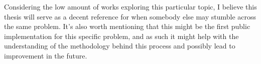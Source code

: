 Considering the low amount of works exploring this particular topic, I believe this thesis will serve as a decent reference for when somebody else may stumble across the same problem. It's also worth mentioning that this might be the first public implementation for this specific problem, and as such it might help with the understanding of the methodology behind this process and possibly lead to improvement in the future.

